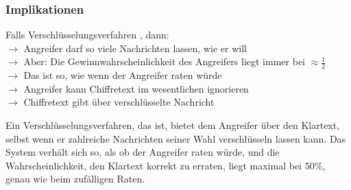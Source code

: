\subsubsection*{Implikationen}
Falls Verschlüsselungsverfahren , dann:\\
$\rightarrow$ Angreifer darf so viele Nachrichten  lassen, wie er will\\
$\rightarrow$ Aber: Die Gewinnwahrscheinlichkeit des Angreifers liegt immer bei $\approx \frac{1}{2}$\\
$\rightarrow$ Das ist so, wie wenn der Angreifer  raten würde\\
$\rightarrow$ Angreifer kann Chiffretext  im wesentlichen ignorieren\\
$\rightarrow$ Chiffretext  gibt  über verschlüsselte Nachricht 
\begin{infoBox}
    Ein Verschlüsselungsverfahren, das  ist, bietet dem Angreifer  über den Klartext, selbst wenn er zahlreiche Nachrichten seiner Wahl verschlüsseln lassen kann. Das System verhält sich so, als ob der Angreifer raten würde, und die Wahrscheinlichkeit, den Klartext korrekt zu erraten, liegt maximal bei 50\%, genau wie beim zufälligen Raten.
\end{infoBox}

